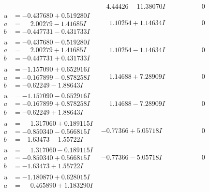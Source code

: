 \documentclass[1p]{elsarticle_modified}
\theoremstyle{definition}
\begin{document}
$$\begin{array}{c|c|c}
 & -4.44426 - 11.38070 I & \phantom{-0.000000 } 0 \\ \hline\begin{aligned}
u &= -0.437680 + 0.519280 I \\
a &= \phantom{-}2.00279 - 1.41685 I \\
b &= -0.447731 - 0.431733 I\end{aligned}
 & \phantom{-}1.10254 + 1.14634 I & \phantom{-0.000000 } 0 \\ \hline\begin{aligned}
u &= -0.437680 - 0.519280 I \\
a &= \phantom{-}2.00279 + 1.41685 I \\
b &= -0.447731 + 0.431733 I\end{aligned}
 & \phantom{-}1.10254 - 1.14634 I & \phantom{-0.000000 } 0 \\ \hline\begin{aligned}
u &= -1.157090 + 0.652916 I \\
a &= -0.167899 - 0.878258 I \\
b &= -0.62249 - 1.88643 I\end{aligned}
 & \phantom{-}1.14688 + 7.28909 I & \phantom{-0.000000 } 0 \\ \hline\begin{aligned}
u &= -1.157090 - 0.652916 I \\
a &= -0.167899 + 0.878258 I \\
b &= -0.62249 + 1.88643 I\end{aligned}
 & \phantom{-}1.14688 - 7.28909 I & \phantom{-0.000000 } 0 \\ \hline\begin{aligned}
u &= \phantom{-}1.317060 + 0.189115 I \\
a &= -0.850340 - 0.566815 I \\
b &= -1.63473 - 1.55722 I\end{aligned}
 & -0.77366 + 5.05718 I & \phantom{-0.000000 } 0 \\ \hline\begin{aligned}
u &= \phantom{-}1.317060 - 0.189115 I \\
a &= -0.850340 + 0.566815 I \\
b &= -1.63473 + 1.55722 I\end{aligned}
 & -0.77366 - 5.05718 I & \phantom{-0.000000 } 0 \\ \hline\begin{aligned}
u &= -1.180870 + 0.628015 I \\
a &= \phantom{-}0.465890 + 1.183290 I \\

\end{aligned}
\end{array}$$
\end{document}
